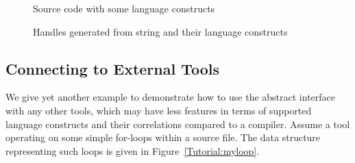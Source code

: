 \begin{figure}[!h]
{\indent
{\mySmallestFontSize
\begin{latexonly}
  
\end{latexonly}

\begin{htmlonly}
   
\end{htmlonly}

}
}
\caption{Source code with some language constructs}
\label{Tutorial:abstractHandle2input}
\end{figure}


\begin{figure}[!h]
{\indent
{\mySmallestFontSize
\begin{latexonly}
  
\end{latexonly}

\begin{htmlonly}
   
\end{htmlonly}

}
}
\caption{Handles generated from string and their language constructs}
\label{Tutorial:abstractHandle2out}
\end{figure}

\subsection{Connecting to External Tools}
We give yet another example to demonstrate how to use the abstract interface
with any other tools, which may have less features in terms of
supported language constructs and their correlations compared to a compiler. 
Assume a tool operating on some simple for-loops
within a source file. The data structure representing such loops is given
in Figure~\ref{Tutorial:myloop}.

